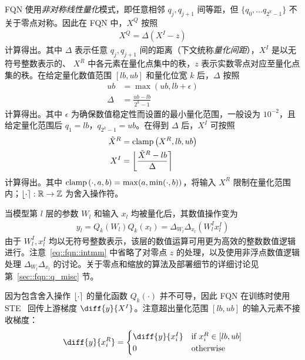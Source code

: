 FQN 使用\emph{非对称线性量化}模式，即任意相邻 $q_j, q_{j+1}$ 间等距，但 $\{q_0, \ldots q_{2^k-1}\}$ 不关于零点对称。因此在 FQN 中，$X^Q$ 按照
\begin{align}
  X^Q = \Delta (X^I - z) \label{eq::fqn::asymm_linear_q}
\end{align}
计算得出。其中 $\Delta$ 表示任意 $q_j, q_{j+1}$ 间的距离（下文统称\emph{量化间距}），$X^I$ 是以无符号整数表示的、 $X^R$ 中各元素在量化点集中的秩，$z$ 表示实数零点对应至量化点集的秩。在给定量化数值范围 $[lb, ub]$ 和量化位宽 $k$ 后，$\Delta$ 按照
\begin{align}
  ub &= \max(ub, lb + \epsilon) \\
  \Delta &= \frac{ub - lb}{2^k - 1}
\end{align}
计算得出。其中 $\epsilon$ 为确保数值稳定性而设置的最小量化范围，一般设为 $10^{-2}$，且给定量化范围后 $q_1 = lb$，$q_{2^k-1} = ub$。在得到 $\Delta$ 后，$X^I$ 可按照
\begin{align}
  \tilde{X}^R &= \mathrm{clamp}\left( X^R, lb, ub \right) \\
  X^I &= \left\lfloor \frac{\tilde{X}^R - lb}{\Delta} \right\rceil
\end{align}
计算得出。其中 $\mathrm{clamp}\left( \cdot, a, b \right) = \max(a, \min(\cdot, b))$，将输入 $X^R$ 限制在量化范围内；$\left\lfloor \cdot \right\rceil: \mathbb{R}\to\mathbb{Z}$ 为舍入操作符。

当模型第 $l$ 层的参数 $W_l$ 和输入 $x_l$ 均被量化后，其数值操作变为
\begin{align}
  y_l = Q_k(W_l) Q_k(x_l) = \Delta_{W_l}\Delta_{x_l} (W^I_l x^I_l) \label{eq::fqn::intmm}
\end{align}
由于 $W^I_l, x^I_l$ 均以无符号整数表示，该层的数值运算可用更为高效的整数数值逻辑进行。注意~\eqref{eq::fqn::intmm} 中省略了对零点 $z$ 的处理，以及使用非浮点数值逻辑处理 $\Delta_{W_l}\Delta_{x_l}$ 的讨论。关于零点和缩放的算法及部署细节的详细讨论见第~\ref{sec::fqn::q_misc} 节。%

因为包含舍入操作 $\left\lfloor \cdot \right\rceil$ 的量化函数 $Q_k(\cdot)$ 并不可导，因此 FQN 在训练时使用 STE~\citep{bengio2013estimating} 回传上游梯度 $\diff{y}{X^I}$。注意超出量化范围 $[lb, ub]$ 的输入元素不接收梯度：
\begin{align}
  \diff{y}{x^R_i} = 
    \begin{cases}
      \diff{y}{x^I_i} & \text{if } x^R_i \in [lb, ub] \\
      0 & \text{otherwise}
    \end{cases}
\end{align}
